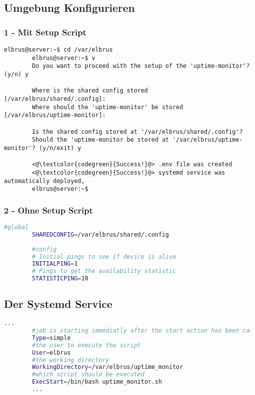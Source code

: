 	\subsection[file config]{Umgebung Konfigurieren}
	\subsubsection{1 - Mit Setup Script}
	
	\lstset{style=commands}
	\begin{lstlisting}[caption={Ausführen des 'install.sh' Scripts.}]
		elbrus@server:~$ cd /var/elbrus
		elbrus@server:~$ v
		Do you want to proceed with the setup of the 'uptime-monitor'? (y/n) y
		
		Where is the shared config stored [/var/elbrus/shared/.config]:
		Where should the 'uptime-monitor' be stored [/var/elbrus/uptime-monitor]:
		
		Is the shared config stored at '/var/elbrus/shared/.config'?
		Should the 'uptime-monitor be stored at '/var/elbrus/uptime-monitor'? (y/n/exit) y
		
		<@\textcolor{codegreen}{Success!}@> .env file was created
		<@\textcolor{codegreen}{Success!}@> systemd service was automatically deployed,
		elbrus@server:~$
	\end{lstlisting}
	
	\subsubsection{2 - Ohne Setup Script}
	
	\lstset{style=files}
	\begin{lstlisting}[caption={Anhand von '.env.example' eigene '.env' Datei anlegen.}, language=bash]
		#global
		SHAREDCONFIG=/var/elbrus/shared/.config
		
		#config
		# Initial pings to see if device is alive
		INITIALPING=1
		# Pings to get the availability statistic
		STATISTICPING=10
	\end{lstlisting}
	\newpage
	
	\subsection[systemd service]{Der Systemd Service}
	
	\lstset{style=files}
	\begin{lstlisting}[caption={uptime\_monitor.service.example - Die Variable 'WorkingDirectory' sowie die Variable 'User' anpassen.},language=bash ,keywords={WorkingDirectory, User}, keywordstyle=\color{red}, firstnumber=5]
		...
		#job is starting immediatly after the start action has been called
		Type=simple
		#the user to execute the script
		User=elbrus
		#the working directory
		WorkingDirectory=/var/elbrus/uptime_monitor
		#which script should be executed
		ExecStart=/bin/bash uptime_monitor.sh
		...
	\end{lstlisting}
	
